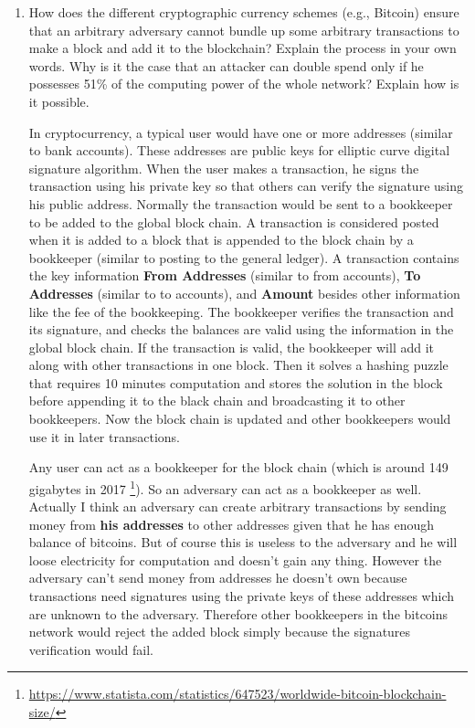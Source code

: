 \documentclass[12pt,a4paper]{article}
\begin{document}
\begin{enumerate}
\item How does the different cryptographic currency schemes (e.g., Bitcoin) ensure
that an arbitrary adversary cannot bundle up some arbitrary transactions to make a
block and add it to the blockchain? Explain the process in your own words. Why is it
the case that an attacker can double spend only if he possesses 51\% of the computing
power of the whole network? Explain how is it possible.


\color{blue}

In cryptocurrency, a typical user would have one or more addresses (similar to bank accounts). These addresses are public keys for elliptic curve digital signature algorithm. When the user makes a transaction, he signs the transaction using his private key so that others can verify the signature using his public address. Normally the transaction would be sent to a bookkeeper to be added to the global block chain. 
A transaction is considered posted when it is added to a block that is appended to the block chain by a bookkeeper (similar to posting to the general ledger). A transaction contains the key information \textbf{From Addresses} (similar to from accounts), \textbf{To Addresses} (similar to to accounts),  and \textbf{Amount} besides other information like the fee of the bookkeeping. The bookkeeper verifies the transaction and its signature, and checks the balances are valid using the information in the global block chain. If the transaction is valid, the bookkeeper will add it along with other transactions in one block. Then it solves a hashing puzzle that requires 10 minutes computation and stores the solution in the block before appending it to the black chain and broadcasting it to other bookkeepers. Now the block chain is updated and other bookkeepers would use it in later transactions.


Any user can act as a bookkeeper for the block chain (which is around 149 gigabytes in 2017 \footnote{\url{https://www.statista.com/statistics/647523/worldwide-bitcoin-blockchain-size/}}). So an adversary can act as a bookkeeper as well. Actually I think an adversary can create arbitrary transactions by sending money from \textbf{his addresses} to other addresses given that he has enough balance of bitcoins. But of course this is useless to the adversary and he will loose electricity for computation and doesn't gain any thing. However the adversary can't send money from addresses he doesn't own because transactions need signatures using the private keys of these addresses which are unknown to the adversary. Therefore other bookkeepers in the bitcoins network would reject the added block simply because the signatures verification would fail.  


\end{enumerate}
\end{document}
